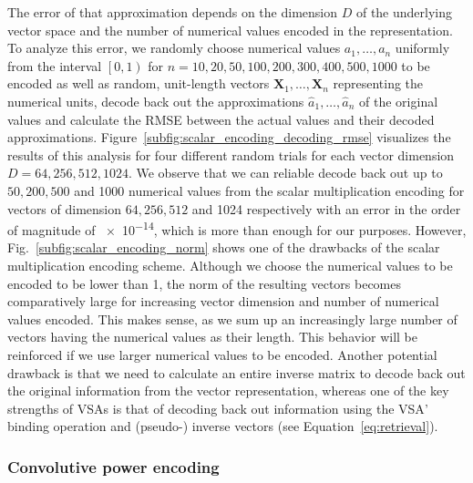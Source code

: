 The error of that approximation depends on the dimension $D$ of the underlying vector space and the number of numerical values encoded in the representation.
To analyze this error, we randomly choose numerical values $a_{1}, \ldots, a_{n}$ uniformly from the interval $ \left[0, 1\right)$ for $n=10, 20, 50,100,200,300,400,500,1000$ to be encoded as well as random, unit-length vectors $\mathbf{X}_{1}, \ldots, \mathbf{X}_{n}$ representing the numerical units, decode back out the approximations $\hat{a}_{1}, \ldots, \hat{a}_{n}$ of the original values and calculate the \ac{RMSE} between the actual values and their decoded approximations.
Figure~\ref{subfig:scalar_encoding_decoding_rmse} visualizes the results of this analysis for four different random trials for each vector dimension  $D=64, 256, 512, 1024$.
We observe that we can reliable decode back out up to $50, 200, 500$ and \num{1000} numerical values from the scalar multiplication encoding for vectors of dimension $64, 256, 512$ and \num{1024} respectively with an error in the order of magnitude of \num{e-14}, which is more than enough for our purposes.
However, Fig.~\ref{subfig:scalar_encoding_norm} shows one of the drawbacks of the scalar multiplication encoding scheme.
Although we choose the numerical values to be encoded to be lower than \num{1}, the norm of the resulting vectors becomes comparatively large for increasing vector dimension and number of numerical values encoded.
This makes sense, as we sum up an increasingly large number of vectors having the numerical values as their length.
This behavior will be reinforced if we use larger numerical values to be encoded.
Another potential drawback is that we need to calculate an entire inverse matrix to decode back out the original information from the vector representation, whereas one of the key strengths of \acp{VSA} is that of decoding back out information using the \ac{VSA}' binding operation and (pseudo-) inverse vectors (see Equation~\eqref{eq:retrieval}).

\subsubsection{Convolutive power encoding}%
\label{ssubsec:convolutive_power_encoding}

